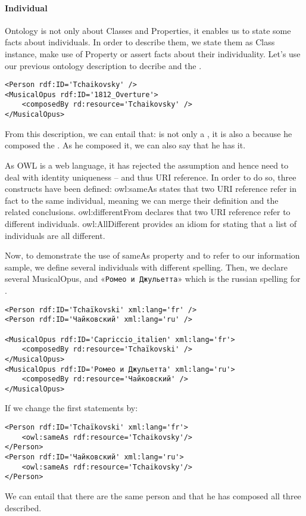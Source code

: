 \paragraph{Individual}
Ontology is not only about Classes and Properties, it enables us to state some facts about individuals. In order to describe them, we state them as Class instance, make use of Property or assert facts about their individuality. 
Let's use our previous ontology description to decribe  and the .
\begin{Verbatim}[fontsize=\small,formatcom=\color{black!70}]
<Person rdf:ID='Tchaikovsky' />
<MusicalOpus rdf:ID='1812_Overture'>
	<composedBy rd:resource='Tchaikovsky' />
</MusicalOpus>
\end{Verbatim}

From this description, we can entail that:
 is not only a , it is also a  because he composed the . As he composed it, we can also say that he has  it. 

As OWL is a web language, it has rejected the  assumption and hence need to deal with identity uniqueness – and thus URI reference. In order to do so, three constructs have been defined:
owl:sameAs states that two URI reference refer in fact to the same individual, meaning we can merge their definition and the related conclusions. 
owl:differentFrom declares that two URI reference refer to different individuals. 
owl:AllDifferent provides an idiom for stating that a list of individuals are all different. 

Now, to demonstrate the use of sameAs property and to refer to our information sample, we define several  individuals with different spelling. Then, we declare several MusicalOpus,  and «\verb?Ромео и Джульетта?» which is the russian spelling for .

\begin{Verbatim}[fontsize=\small,formatcom=\color{black!70}]
<Person rdf:ID='Tchaïkovski' xml:lang='fr' />
<Person rdf:ID='Чайкoвский' xml:lang='ru' />

<MusicalOpus rdf:ID='Capriccio_italien' xml:lang='fr'>
	<composedBy rd:resource='Tchaïkovski' />
</MusicalOpus>
<MusicalOpus rdf:ID='Ромео и Джульетта' xml:lang='ru'>
	<composedBy rd:resource='Чайкoвский' />
</MusicalOpus>
\end{Verbatim}
If we change the first statements by:
\begin{Verbatim}[fontsize=\small,formatcom=\color{black!70}]
<Person rdf:ID='Tchaïkovski' xml:lang='fr'>
	<owl:sameAs rdf:resource='Tchaikovsky'/>
</Person>
<Person rdf:ID='Чайкoвский' xml:lang='ru'>
	<owl:sameAs rdf:resource='Tchaikovsky'/>
</Person>
\end{Verbatim}
We can entail that there are the same person and that he has composed all three  described. 
















